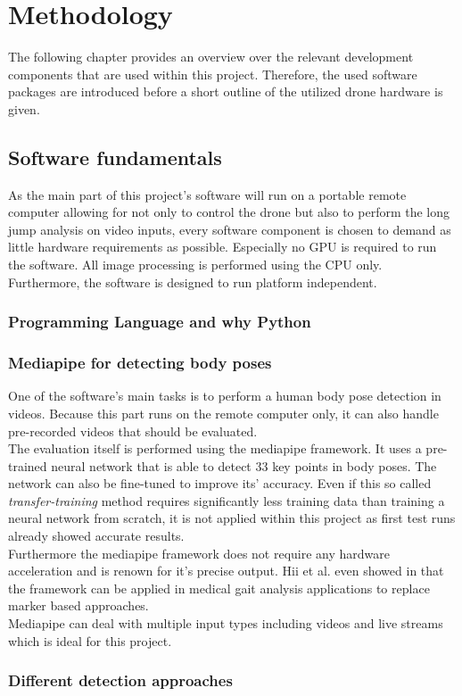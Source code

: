 \graphicspath{{./figures/}}
\chapter{Methodology} 
The following chapter provides an overview over the relevant development 
components that are used within this project.
Therefore, the used software packages are introduced before a short outline of
the utilized drone hardware is given.

\section{Software fundamentals}
\label{sec:2_software_fund}
As the main part of this project's software will run on a portable remote 
computer allowing for not only to control the drone but also to perform the 
long jump analysis on video inputs, every software component is chosen to 
demand as little hardware requirements as possible.
Especially no \ac{GPU} is required to run the software.
All image processing is performed using the \ac{CPU} only.
Furthermore, the software is designed to run platform independent.\\

\subsection{Programming Language and why Python}
\label{subsec:2_programming_language}

\subsection{Mediapipe for detecting body poses}
\label{subsec:2_mediapipe_framework}
One of the software's main tasks is to perform a human body pose detection in
videos.
Because this part runs on the remote computer only, it can also handle
pre-recorded videos that should be evaluated.\\
The evaluation itself is performed using the mediapipe framework.
It uses a pre-trained neural network that is able to detect 33 key points in 
body poses.
The network can also be fine-tuned to improve its' accuracy.
Even if this so called \textit{transfer-training} method requires significantly
less training data than training a neural network from scratch, it is not applied
within this project as first test runs already showed accurate results.\\
Furthermore the mediapipe framework does not require any hardware acceleration
and is renown for it's precise output.
Hii et al. even showed in \cite{mp_gait_analysis} that the framework can be 
applied in medical gait analysis applications to replace marker based 
approaches.\\
Mediapipe can deal with multiple input types including videos and live streams
which is ideal for this project.

\subsection*{Different detection approaches}
